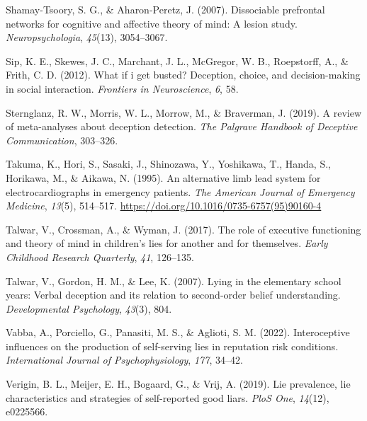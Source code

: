 \documentclass[
  man,floatsintext]{apa6}
\newlength{\cslhangindent}
\newlength{\cslentryspacingunit} %
\newenvironment{CSLReferences}[2] %
 {%
  \setlength{\parindent}{0pt}
  \ifodd #1
  \let\oldpar\par
  \def\par{\hangindent=\cslhangindent\oldpar}
  \fi
  \setlength{\parskip}{#2\cslentryspacingunit}
 }%
 {}
\begin{document}
\begin{CSLReferences}{1}{0}
\leavevmode{}%
Shamay-Tsoory, S. G., \& Aharon-Peretz, J. (2007). Dissociable prefrontal networks for cognitive and affective theory of mind: A lesion study. \emph{Neuropsychologia}, \emph{45}(13), 3054--3067.

\leavevmode{}%
Sip, K. E., Skewes, J. C., Marchant, J. L., McGregor, W. B., Roepstorff, A., \& Frith, C. D. (2012). What if i get busted? Deception, choice, and decision-making in social interaction. \emph{Frontiers in Neuroscience}, \emph{6}, 58.

\leavevmode{}%
Sternglanz, R. W., Morris, W. L., Morrow, M., \& Braverman, J. (2019). A review of meta-analyses about deception detection. \emph{The Palgrave Handbook of Deceptive Communication}, 303--326.

\leavevmode{}%
Takuma, K., Hori, S., Sasaki, J., Shinozawa, Y., Yoshikawa, T., Handa, S., Horikawa, M., \& Aikawa, N. (1995). An alternative limb lead system for electrocardiographs in emergency patients. \emph{The American Journal of Emergency Medicine}, \emph{13}(5), 514--517. \url{https://doi.org/10.1016/0735-6757(95)90160-4}

\leavevmode{}%
Talwar, V., Crossman, A., \& Wyman, J. (2017). The role of executive functioning and theory of mind in children's lies for another and for themselves. \emph{Early Childhood Research Quarterly}, \emph{41}, 126--135.

\leavevmode{}%
Talwar, V., Gordon, H. M., \& Lee, K. (2007). Lying in the elementary school years: Verbal deception and its relation to second-order belief understanding. \emph{Developmental Psychology}, \emph{43}(3), 804.

\leavevmode{}%
Vabba, A., Porciello, G., Panasiti, M. S., \& Aglioti, S. M. (2022). Interoceptive influences on the production of self-serving lies in reputation risk conditions. \emph{International Journal of Psychophysiology}, \emph{177}, 34--42.

\leavevmode{}%
Verigin, B. L., Meijer, E. H., Bogaard, G., \& Vrij, A. (2019). Lie prevalence, lie characteristics and strategies of self-reported good liars. \emph{PloS One}, \emph{14}(12), e0225566.


\end{CSLReferences}
\end{document}
